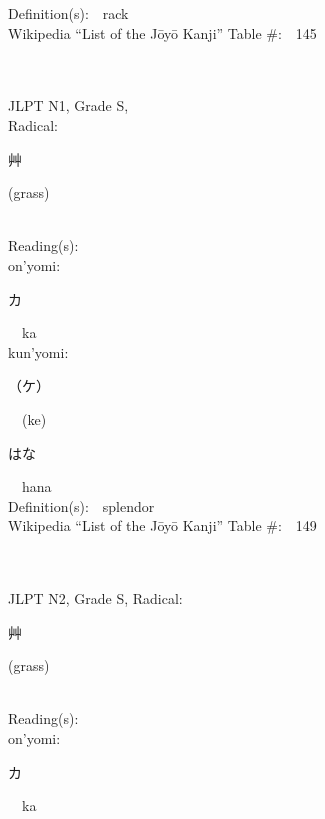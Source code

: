 \begin{multicols}{2}
Definition(s):\ \ rack \\
Wikipedia ``List of the J\=oy\=o Kanji'' Table \#:\ \ 145 \\
\ \ \\
{\fontsize{34pt}{40pt}  }\ \ \\
{JLPT N1, Grade S, \\Radical:\ \ {\begin{CJK}{UTF8}{min} 艸 \end{CJK}} (grass) } \\
Reading(s):\ \ \\
{\hspace*{1em}}on'yomi:\ \ \\
{\hspace*{2em}}{\begin{CJK}{UTF8}{min} カ \end{CJK}}\ \ ka\ \ \\
{\hspace*{1em}}kun'yomi:\ \ \\
{\hspace*{2em}}{\begin{CJK}{UTF8}{min} （ケ） \end{CJK}}\ \ (ke)\ \ \\
{\hspace*{2em}}{\begin{CJK}{UTF8}{min} はな \end{CJK}}\ \ hana\ \ \\
Definition(s):\ \ splendor \\
Wikipedia ``List of the J\=oy\=o Kanji'' Table \#:\ \ 149 \\
\ \ \\
{\fontsize{34pt}{40pt}  }\ \ \\  %
{JLPT N2, Grade S, Radical:\ \ {\begin{CJK}{UTF8}{min} 艸 \end{CJK}} (grass) } \\
Reading(s):\ \ \\
{\hspace*{1em}}on'yomi:\ \ \\
{\hspace*{2em}}{\begin{CJK}{UTF8}{min} カ \end{CJK}}\ \ ka\ \ \\

\end{multicols}
